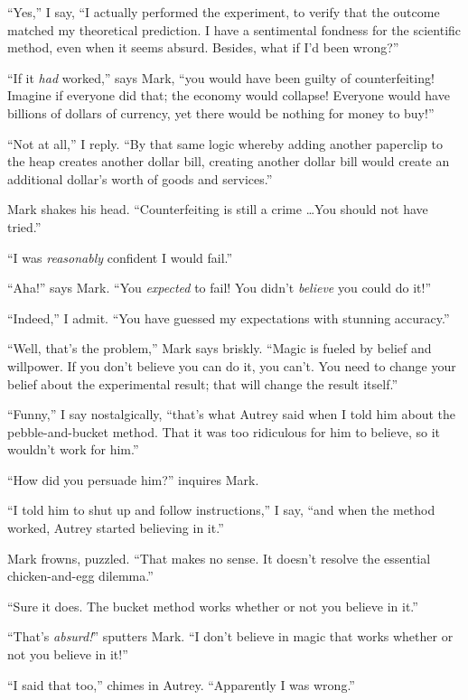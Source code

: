{
 ``Yes,'' I say,
``I actually performed the experiment, to verify that
the outcome matched my theoretical prediction. I have a sentimental
fondness for the scientific method, even when it seems absurd. Besides,
what if I'd been wrong?''}

{
 ``If it \textit{had} worked,''
says Mark, ``you would have been guilty of
counterfeiting! Imagine if everyone did that; the economy would
collapse! Everyone would have billions of dollars of currency, yet
there would be nothing for money to buy!''}

{
 ``Not at all,'' I reply.
``By that same logic whereby adding another paperclip
to the heap creates another dollar bill, creating another dollar bill
would create an additional dollar's worth of goods and
services.''}

{
 Mark shakes his head. ``Counterfeiting is still a
crime \ldots You should not have tried.''}

{
 ``I was \textit{reasonably} confident I would
fail.''}

{
 ``Aha!'' says Mark.
``You \textit{expected} to fail! You
didn't \textit{believe} you could do
it!''}

{
 ``Indeed,'' I admit.
``You have guessed my expectations with stunning
accuracy.''}

{
 ``Well, that's the
problem,'' Mark says briskly.
``Magic is fueled by belief and willpower. If you
don't believe you can do it, you can't.
You need to change your belief about the experimental result; that will
change the result itself.''}

{
 ``Funny,'' I say nostalgically,
``that's what Autrey said when I told
him about the pebble-and-bucket method. That it was too ridiculous for
him to believe, so it wouldn't work for
him.''}

{
 ``How did you persuade him?''
inquires Mark.}

{
 ``I told him to shut up and follow
instructions,'' I say, ``and when
the method worked, Autrey started believing in it.''}

{
 Mark frowns, puzzled. ``That makes no sense. It
doesn't resolve the essential chicken-and-egg
dilemma.''}

{
 ``Sure it does. The bucket method works whether
or not you believe in it.''}

{
 ``That's
\textit{absurd!}'' sputters Mark.
``I don't believe in magic that works
whether or not you believe in it!''}

{
 ``I said that too,'' chimes in
Autrey. ``Apparently I was wrong.''}

